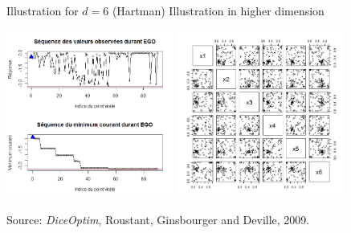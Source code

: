 \begin{frame}{}
\begin{exampleblock}{Illustration for $d=6$ (Hartman)}
	Illustration in higher dimension
\begin{center}
\includegraphics[height=5.5cm]{4_optimization/figures/egoHartman} \includegraphics[height=5.5cm]{4_optimization/figures/egoHartman2}
\end{center}
\small Source: \textit{DiceOptim}, Roustant, Ginsbourger and Deville, 2009.
\end{exampleblock}
\end{frame}

